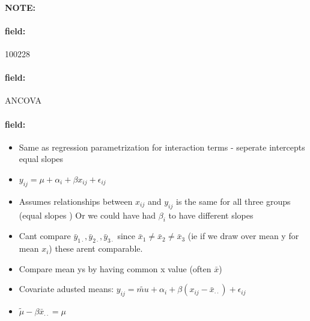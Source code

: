 \documentclass[12pt]{article}
\newenvironment{note}{\paragraph{NOTE:}}{}
\newenvironment{field}{\paragraph{field:}}{}
\begin{document}
\begin{note}
    \begin{field}
        \tiny 100228
    \end{field}
    \begin{field}
        ANCOVA
    \end{field}
    \begin{field}
        \begin{itemize}
          \item Same as regression parametrization for interaction terms - seperate intercepts equal slopes
          \item $y_{ij} = \mu + \alpha_i + \beta x_{ij} + \epsilon_{ij}$
          \item Assumes relationships between $x_{ij}$ and $y_{ij}$ is the same for all three groups (equal slopes ) Or we could have had $\beta_i$ to have different slopes
          \item Cant compare $\bar{y}_{1 \cdot}, \bar{y}_{2 \cdot},\bar{y}_{3 \cdot}$ since $\bar{x}_1 \neq \bar{x}_2 \neq \bar{x}_3$ (ie if we draw over mean y for mean $x_i$) these arent comparable.
          \item Compare mean ys by having common x value (often $\bar{x}$)
          \item Covariate adusted means: $y_{ij} = \tilde{mu} + \alpha_i + \beta(x_{ij} - \bar{x}_{\cdot\cdot}) + \epsilon_{ij}$
          \item $\tilde{\mu} - \beta\bar{x}_{\cdot\cdot} = \mu$
        \end{itemize}
    \end{field}
\end{note}

\end{document}
